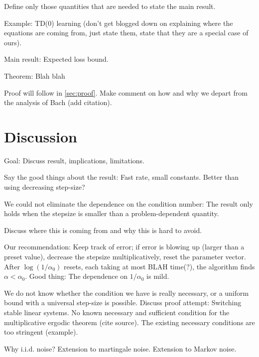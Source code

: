 \documentclass{article}
\begin{document}
Define only those quantities that are needed to state the main result.

Example: TD(0) learning (don't get blogged down on explaining where the equations are coming from,
just state them, state that they are a special case of ours).

Main result: Expected loss bound.

Theorem: Blah blah

Proof will follow in \cref{sec:proof}.
Make comment on how and why we depart from the analysis of Bach (add citation).


\section{Discussion}
Goal: Discuss result, implications, limitations.

Say the good things about the result: Fast rate, small constants.
Better than using decreasing step-size?

We could not eliminate the dependence on the condition number:
The result only holds when the stepsize is smaller than a problem-dependent quantity.

Discuss where this is coming from and why this is hard to avoid.

Our recommendation: Keep track of error; if error is blowing up (larger than a preset value), decrease the stepsize
multiplicatively, reset the parameter vector. After $\log(1/\alpha_0)$ resets, each taking at most BLAH time(?),
the algorithm finds $\alpha<\alpha_0$. Good thing: The dependence on $1/\alpha_0$ is mild.

We do not know whether the condition we have is really necessary,
or a uniform bound with a universal step-size is possible.
Discuss proof attempt: Switching stable linear systems.
No known necessary and sufficient condition for the multiplicative ergodic theorem (cite source).
The existing necessary conditions are too stringent (example).

Why i.i.d. noise? 
Extension to martingale noise.
Extension to Markov noise.
\end{document}
